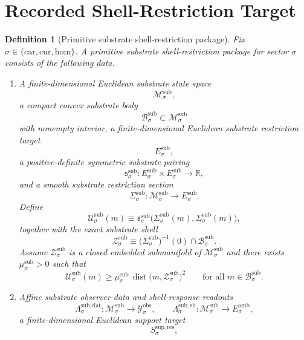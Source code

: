 \documentclass[11pt]{article}
\newcommand{\Car}{\mathrm{car}}
\newcommand{\Cur}{\mathrm{cur}}
\newcommand{\Hom}{\mathrm{hom}}
\newcommand{\DataSpace}[1]{\mathcal Y_{#1}^{\mathrm{obs}}}
\newcommand{\AmbientTarget}[1]{E_{#1}^{\mathrm{amb}}}
\newcommand{\ResTarget}[1]{S_{#1}^{\mathrm{sup,res}}}
\newcommand{\SubSpace}[1]{\mathcal M_{#1}^{\mathrm{sub}}}
\newcommand{\SubBody}[1]{\mathcal B_{#1}^{\mathrm{sub}}}
\newcommand{\SubTarget}[1]{E_{#1}^{\mathrm{sub}}}
\newcommand{\SubPair}[1]{\mathfrak s_{#1}^{\mathrm{sub}}}
\newcommand{\SubSection}[1]{\Sigma_{#1}^{\mathrm{sub}}}
\newcommand{\SubFunctional}[1]{\mathscr U_{#1}^{\mathrm{sub}}}
\newcommand{\SubShellSet}[1]{\mathcal Z_{#1}^{\mathrm{sub}}}
\newcommand{\SubData}[1]{\Lambda_{#1}^{\mathrm{sub,dat}}}
\newcommand{\SubShellMap}[1]{\Lambda_{#1}^{\mathrm{sub,sh}}}
\newtheorem{definition}{Definition}
\begin{document}
\section{Recorded Shell-Restriction Target}

\begin{definition}[Primitive substrate shell-restriction package]
\label{def:target}
Fix \(\sigma\in\{\Car,\Cur,\Hom\}\). A \emph{primitive substrate shell-restriction package} for sector \(\sigma\) consists of the following data.
\begin{enumerate}
    \item A finite-dimensional Euclidean substrate state space
    \[
    \SubSpace{\sigma},
    \]
    a compact convex substrate body
    \[
    \SubBody{\sigma}\subset\SubSpace{\sigma}
    \]
    with nonempty interior, a finite-dimensional Euclidean substrate restriction target
    \[
    \SubTarget{\sigma},
    \]
    a positive-definite symmetric substrate pairing
    \[
    \SubPair{\sigma}:
    \SubTarget{\sigma}\times\SubTarget{\sigma}\to\mathbb R,
    \]
    and a smooth substrate restriction section
    \[
    \SubSection{\sigma}:\SubSpace{\sigma}\to\SubTarget{\sigma}.
    \]
    Define
    \begin{equation}
    \SubFunctional{\sigma}(m)
    \equiv
    \SubPair{\sigma}\bigl(\SubSection{\sigma}(m),\SubSection{\sigma}(m)\bigr),
    \label{eq:subfunctional}
    \end{equation}
    together with the exact substrate shell
    \begin{equation}
    \SubShellSet{\sigma}
    \equiv
    \bigl(\SubSection{\sigma}\bigr)^{-1}(0)\cap\SubBody{\sigma}.
    \label{eq:subshell}
    \end{equation}
    Assume \(\SubShellSet{\sigma}\) is a closed embedded submanifold of \(\SubSpace{\sigma}\) and there exists \(\mu_{\sigma}^{\mathrm{sub}}>0\) such that
    \begin{equation}
    \SubFunctional{\sigma}(m)
    \ge
    \mu_{\sigma}^{\mathrm{sub}}\,
    \operatorname{dist}\bigl(m,\SubShellSet{\sigma}\bigr)^{2}
    \qquad
    \text{for all }m\in\SubBody{\sigma}.
    \label{eq:subnormal}
    \end{equation}
    \item Affine substrate observer-data and shell-response readouts
    \[
    \SubData{\sigma}:\SubSpace{\sigma}\to\DataSpace{\sigma},
    \qquad
    \SubShellMap{\sigma}:\SubSpace{\sigma}\to\AmbientTarget{\sigma},
    \]
    a finite-dimensional Euclidean support target
    \[
    \ResTarget{\sigma},
\]
\end{enumerate}
\end{definition}
\end{document}
